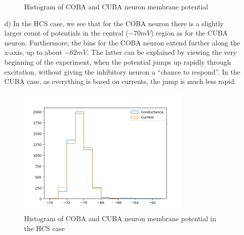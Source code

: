 \documentclass{scrartcl}
\begin{document}
\begin{itemize}
\begin{figure}[h]
    \caption{Histogram of COBA and CUBA neuron membrane potential}
    \label{hist0}
\end{figure}
        \item[d)] In the HCS case, we see that for the COBA neuron
        there is a slightly larger count of potentials in the central ($-70mV$) region
        as for the CUBA neuron. Furthermore, the bins for the COBA neuron extend
        further along the x-axis, up to about $-62mV$. The latter can be explained by
        viewing the very beginning of the experiment, when the potential jumps up
        rapidly through excitation, without giving the inhibitory neuron a ``chance
        to respond''. In the CUBA case, as everything is based on currents, the jump
        is much less rapid.
        \begin{figure}[h]
            \centering
        \includegraphics[width=0.8\textwidth]{hist_5.png}
            \caption{Histogram of COBA and CUBA neuron membrane potential in the HCS case}
        \end{figure}
    \end{itemize}
\end{document}
